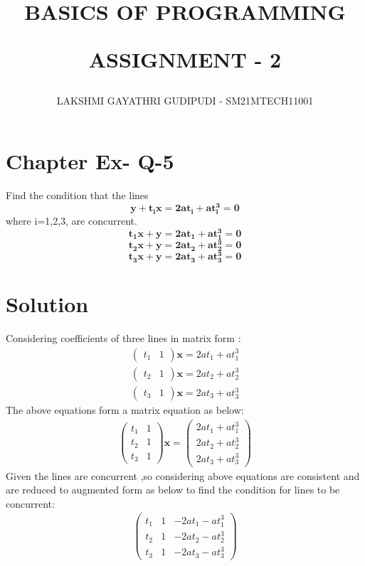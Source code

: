 \documentclass[journal,12pt,twocolumn]{IEEEtran}
\begin{document}
\newcommand{\myvec}[1]{\ensuremath{\begin{pmatrix}#1\end{pmatrix}}}
\newcommand{\cmyvec}[1]{\ensuremath{\begin{pmatrix*}[c]#1\end{pmatrix*}}}
\providecommand{\norm}[1]{\lVert#1\rVert}
\newcommand{\mydet}[1]{\ensuremath{\begin{vmatrix}#1\end{vmatrix}}}
\newcommand{\proj}[2]{\textbf{proj}_{\vec{#1}}\vec{#2}}
\newcommand{\abs}[1]{\left\lvert#1\right\rvert}
\newcommand{\RNum}[1]{\uppercase\expandafter{\romannumeral #1\relax}}
\newcommand{\Rnum}[1]{\lowercase\expandafter{\romannumeral #1\relax}}
\let\StandardTheFigure\thefigure
\let\vec\mathbf

\title{
BASICS OF PROGRAMMING

ASSIGNMENT - 2
}
\author{ LAKSHMI GAYATHRI GUDIPUDI - SM21MTECH11001}
\maketitle
\newpage
\bigskip
\renewcommand{\thefigure}{\theenumi}

\section*{ Chapter \RNum{3} Ex-\RNum{4} Q-5}
\noindent
Find the condition that the lines
$$\mathbf{y+t_i x=2at_i+at_i^3=0}$$
where i=1,2,3, are concurrent. 
$$\mathbf{t_1 x + y = 2at_1 +at_1^3=0}$$
$$\mathbf{t_2 x + y = 2at_2 +at_2^3=0}$$
$$\mathbf{t_3 x + y = 2at_3 +at_3^3=0}$$
\noindent
\section*{\textbf{Solution}}
\noindent
Considering coefficients of three lines in matrix form :
\begin{align}
\myvec{t_1&1}\vec{x}=2at_1+at_1^3\\
\myvec{t_2&1}\vec{x}=2at_2+at_2^3\\
\myvec{t_3&1}\vec{x}=2at_3+at_3^3
\end{align}
The above equations form a matrix equation as below:
\begin{align}
\myvec{t_1&1\\t_2&1\\t_3&1}\vec{x}=\myvec{2at_1+at_1^3\\2at_2+at_2^3\\2at_3+at_3^3}
\end{align}
Given the lines are concurrent ,so considering above equations are consistent and are reduced to augmented form as below to find the condition for lines to be concurrent:
\begin{align}
\myvec{
t_1&1&-2at_1-at_1^3\\
t_2&1&-2at_2-at_2^3\\
t_3&1&-2at_3-at_3^3
}
\end{align}
\end{document}
